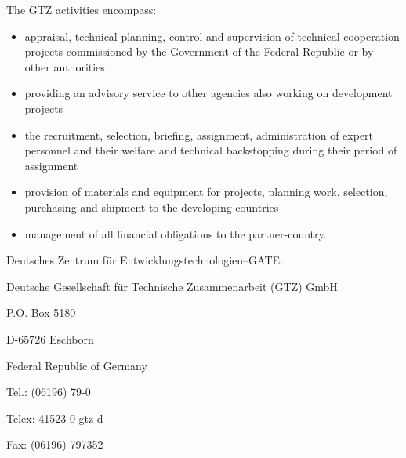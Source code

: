 The GTZ activities encompass:
\begin{itemize}
\item appraisal, technical planning, control and supervision of technical 
cooperation projects commissioned by the Government of the Federal Republic or 
by other authorities

\item providing an advisory service to other agencies also working on 
development projects

\item the recruitment, selection, briefing, assignment, administration of 
expert personnel and their welfare and technical backstopping during their 
period of assignment

\item provision of materials and equipment for projects, planning work, 
selection, purchasing and shipment to the developing countries

\item management of all financial obligations to the partner-country.
\end{itemize}
Deutsches Zentrum f\"{u}r Entwicklungstechnologien--GATE:

Deutsche Gesellschaft f\"{u}r Technische Zusammenarbeit (GTZ) GmbH

P.O. Box 5180

D-65726 Eschborn

Federal Republic of Germany


Tel.: (06196) 79-0

Telex: 41523-0 gtz d

Fax: (06196) 797352

